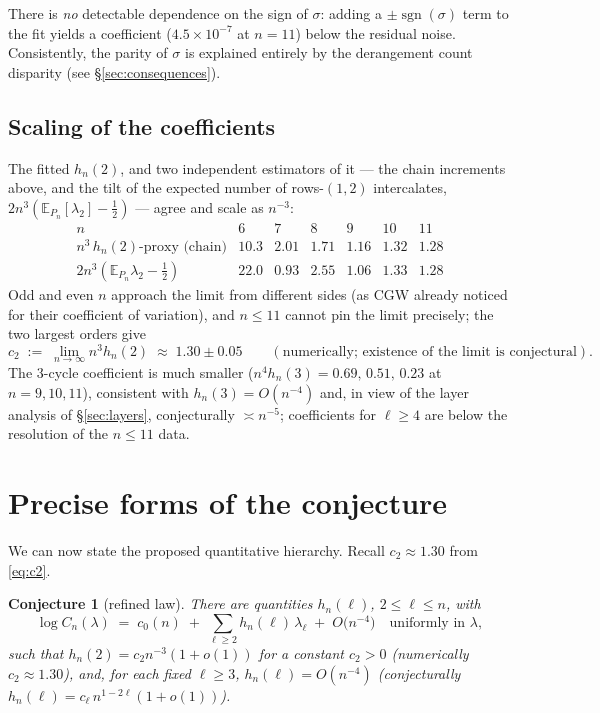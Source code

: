 \documentclass[11pt]{article}
\newtheorem{conjecture}[theorem]{Conjecture}
\theoremstyle{definition}
\DeclareMathOperator{\sgn}{sgn}
\newcommand{\E}{\mathbb{E}}
\newcommand{\PP}{P}
\newcommand{\CC}{C}
\begin{document}
There is \emph{no} detectable dependence on the sign of $\sigma$: adding a
$\pm\sgn(\sigma)$ term to the fit yields a coefficient
($4.5\times10^{-7}$ at $n=11$) below the residual noise.  Consistently, the
parity of $\sigma$ is explained entirely by the derangement count
disparity (see \S\ref{sec:consequences}).

\subsection{Scaling of the coefficients}

The fitted $h_n(2)$, and two independent estimators of it --- the chain
increments above, and the tilt of the expected number of rows-$(1,2)$
intercalates, $2n^3(\E_{\PP_n}[\lambda_2]-\tfrac12)$ --- agree and scale as
$n^{-3}$:
\[
\begin{array}{l|llllll}
n & 6 & 7 & 8 & 9 & 10 & 11\\\hline
n^3\,h_n(2)\text{-proxy (chain)} & 10.3 & 2.01 & 1.71 & 1.16 & 1.32 & 1.28\\
2n^3(\E_{\PP_n}\lambda_2-\tfrac12) & 22.0 & 0.93 & 2.55 & 1.06 & 1.33 & 1.28
\end{array}
\]
Odd and even $n$ approach the limit from different sides (as CGW already
noticed for their coefficient of variation), and $n\le11$ cannot pin the
limit precisely; the two largest orders give
\begin{equation}\label{eq:c2}
c_2 \;:=\; \lim_{n\to\infty} n^{3}h_n(2)\;\approx\;1.30\pm 0.05
\qquad(\text{numerically; existence of the limit is conjectural}).
\end{equation}
The $3$-cycle coefficient is much smaller
($n^4 h_n(3)=0.69,\,0.51,\,0.23$ at $n=9,10,11$), consistent with
$h_n(3)=O(n^{-4})$ and, in view of the layer analysis of
\S\ref{sec:layers}, conjecturally $\asymp n^{-5}$; coefficients for
$\ell\ge4$ are below the resolution of the $n\le 11$ data.

\section{Precise forms of the conjecture}\label{sec:conjectures}

We can now state the proposed quantitative hierarchy.  Recall
$c_2\approx1.30$ from \eqref{eq:c2}.

\begin{conjecture}[refined law]\label{conj:refined}
There are quantities $h_n(\ell)$, $2\le\ell\le n$, with
\[
\log \CC_n(\lambda)\;=\;c_0(n)\;+\;\sum_{\ell\ge2}h_n(\ell)\,\lambda_\ell
\;+\;O\!\bigl(n^{-4}\bigr)
\quad\text{uniformly in }\lambda,
\]
such that $h_n(2)=c_2n^{-3}(1+o(1))$ for a constant $c_2>0$ (numerically
$c_2\approx1.30$), and, for each fixed $\ell\ge3$, $h_n(\ell)=O(n^{-4})$
(conjecturally $h_n(\ell)= c_\ell\,n^{1-2\ell}(1+o(1))$).
\end{conjecture}
\end{document}
